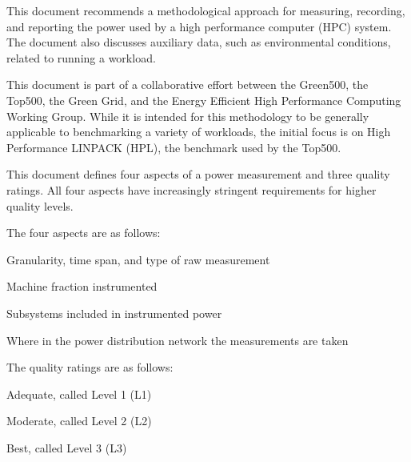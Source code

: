 \noindent
This document recommends a methodological approach for measuring, recording, and reporting the power used by a high performance 
computer (HPC) system. The document also discusses auxiliary data, such as environmental conditions, related to 
running a workload. 
\wl

\noindent
This document is part of a collaborative effort between the Green500, the Top500, 
the Green Grid, and the Energy Efficient High Performance Computing Working Group.  While 
it is intended for this methodology to be generally applicable to benchmarking a variety of 
workloads, the initial focus is on High Performance LINPACK (HPL), the benchmark used by the Top500. 
\wl

\noindent
This document defines four aspects of a power measurement and three quality ratings. All 
four aspects have increasingly stringent requirements for higher quality levels.  
\wl

\noindent
The four aspects are as follows:


\begin{packed_enum}
\item 
Granularity, time span, and type of raw measurement
\item 
Machine fraction instrumented
\item 
Subsystems included in instrumented power
\item 
Where in the power distribution network the measurements are taken
\end{packed_enum}

The quality ratings are as follows:

\begin{packed_item}
\item 
Adequate, called Level 1 (L1)
\item
Moderate, called Level 2 (L2)
\item
Best, called Level 3 (L3)
\end{packed_item}

